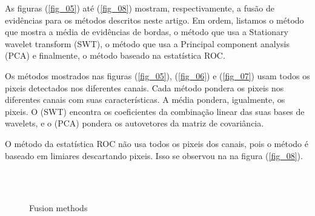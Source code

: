 \documentclass[conference]{IEEEtran}
\begin{document}
As figuras (\ref{fig_05}) até (\ref{fig_08}) mostram, respectivamente, a fusão de evidências para os métodos descritos neste artigo. Em ordem, listamos o método que mostra a média de evidências de bordas, o método que usa a Stationary wavelet transform (SWT), o método que usa a Principal component analysis (PCA) e finalmente, o método baseado na estatística ROC.

Os métodos mostrados nas figuras (\ref{fig_05}), (\ref{fig_06}) e (\ref{fig_07}) usam todos os pixeis detectados nos diferentes canais. Cada método pondera os pixeis nos diferentes canais com suas características. A média pondera, igualmente, os pixeis. O (SWT) encontra os coeficientes da combinação linear das suas bases de wavelets, e o (PCA) pondera os autovetores da matriz de covariância.

O método da estatística ROC não usa todos os pixeis dos canais, pois o método é baseado em limiares descartando pixeis. Isso se observou na na figura (\ref{fig_08}).

\begin{figure}[!ht]
     \hfill
     \\
     \hfill
     \\
     \caption{Fusion methods}
     \label{fig_03}
   \end{figure}
\end{document}
